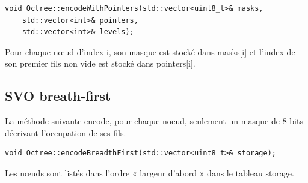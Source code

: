 \documentclass[a4paper]{article}
\begin{document}
\begin{lstlisting}
void Octree::encodeWithPointers(std::vector<uint8_t>& masks, 
	std::vector<int>& pointers, 
	std::vector<int>& levels);
\end{lstlisting}

Pour chaque nœud d'index i, son masque est stocké dans masks[i] et l’index de son premier fils non vide est stocké dans pointers[i].

\subsection{SVO breath-first}

La méthode suivante encode, pour chaque noeud, seulement un masque de 8 bits décrivant l’occupation de ses fils.

\begin{lstlisting}
void Octree::encodeBreadthFirst(std::vector<uint8_t>& storage);
\end{lstlisting}
 
Les nœuds sont listés dans l’ordre « largeur d’abord » dans le tableau storage.
\end{document}
